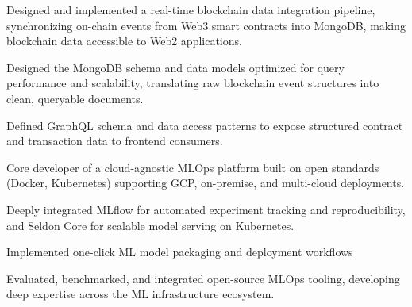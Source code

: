 \documentclass[]{plushcv}
\begin{document}
\begin{minipage}[t]{0.74\textwidth}
\hfill
{}
\vspace{5pt}
\begin{tightemize}
\sectionsep
\item Designed and implemented a real-time blockchain data integration pipeline, synchronizing on-chain events from Web3 smart contracts into MongoDB, making blockchain data accessible to Web2 applications.
\item Designed the MongoDB schema and data models optimized for query performance and scalability, translating raw blockchain event structures into clean, queryable documents.
\item Defined GraphQL schema and data access patterns to expose structured contract and transaction data to frontend consumers.
\end{tightemize}
\sectionsep
\sectionsep


\hfill
{}
\vspace{5pt}
\begin{tightemize}
\sectionsep
\item Core developer of a cloud-agnostic MLOps platform built on open standards (Docker, Kubernetes) supporting GCP, on-premise, and multi-cloud deployments.

\item Deeply integrated MLflow for automated experiment tracking and reproducibility, and Seldon Core for scalable model serving on Kubernetes.

\item Implemented one-click ML model packaging and deployment workflows %

\item Evaluated, benchmarked, and integrated open-source MLOps tooling, developing deep expertise across the ML infrastructure ecosystem.


\end{tightemize}
\end{minipage}
\end{document}
